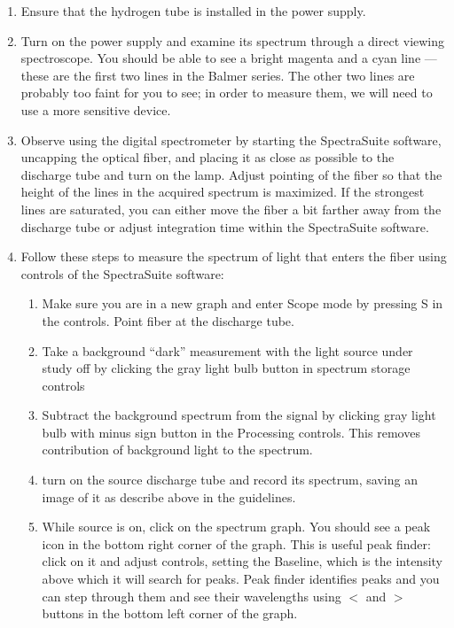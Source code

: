 \begin{enumerate}
	\item Ensure that the hydrogen tube is installed in the power supply.
	
	\item Turn on the power supply and examine its spectrum through a direct viewing spectroscope. You should be able to see a bright
	magenta and a cyan line --- these are the first two lines in the Balmer series. The other two
	lines are probably too faint for you to see; in order to measure them, we will need to use a
	more sensitive device.
	
	\item Observe using the digital spectrometer by starting the SpectraSuite software, uncapping the optical fiber, and placing it as close as possible to the discharge tube and turn on the lamp. Adjust
	pointing of the fiber so that the height of the lines in the acquired spectrum is maximized.
	If the strongest lines are saturated, you can either move the fiber a bit farther away from
	the discharge tube or adjust integration time within the SpectraSuite software.
	
	\item Follow these steps to measure the spectrum of light that enters the fiber using controls of the SpectraSuite software: %
	\begin{enumerate}
		\item Make sure you are in a new graph and enter Scope mode by pressing S in the
		controls. Point fiber at the discharge tube.
		
		\item Take a background ``dark'' measurement with the light source under study off by
		clicking the gray light bulb button in spectrum storage controls%
		
		\item Subtract the background spectrum from the signal by clicking gray light bulb with
		minus sign button in the Processing controls. This removes contribution of
		background light to the spectrum.
		
		\item turn on the source discharge tube and record its spectrum, saving an image of it as describe above in the guidelines.
		
		\item While source is on, click on the spectrum graph. You should see a peak icon in the
		bottom right corner of the graph. This is useful peak finder: click on it and adjust
		controls, setting the Baseline, which is the intensity above which it will search for peaks. Peak finder identifies peaks and you can step through them and see their
		wavelengths using $<$ and $>$ buttons in the bottom left corner of the graph.
	\end{enumerate}


\end{enumerate}
